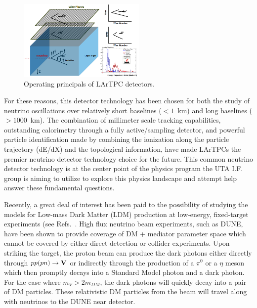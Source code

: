 \begin{figure}[htb]
\centering
\includegraphics[width=0.55\textwidth]{images/lartpc.png}
\caption[]{Operating principals of LArTPC detectors.}
\label{fig:LArTPC}
\end{figure}

For these reasons, this detector technology has been chosen for both the study of neutrino oscillations over relatively short baselines ($<1$~km) and long baselines ($>1000$~km). The combination of millimeter scale tracking capabilities, outstanding calorimetry through a fully active/sampling detector, and powerful particle identification made by combining the ionization along the particle trajectory (dE/dX) and the topological information, have made LArTPCs the premier neutrino detector technology choice for the future.  This common neutrino detector technology is at the center point of the physics program the UTA I.F. group is aiming to utilize to explore this physics landscape and attempt help answer these fundamental questions.

Recently, a great deal of interest has been paid to the possibility of studying the models for Low-mass Dark Matter (LDM) production at low-energy, fixed-target experiments (see Refs.~\cite{if:ldm-1, if:ldm-2,if:ldm-3, if:ldm-4)}.  High flux neutrino beam experiments, such as DUNE, have been shown to provide coverage of DM + mediator parameter space which cannot be covered by either direct detection or collider experiments. Upon striking the target, the proton beam can produce the dark photons either directly through $pp(pn)\rightarrow \bf{V}$ or indirectly through the production of a $\pi^{0}$ or a $\eta$ meson which then promptly decays into a Standard Model photon and a dark photon. For the case where $m_{V} > 2m_{DM}$, the dark photons will quickly decay into a pair of DM particles.  These relativistic DM particles from the beam will travel along with neutrinos to the DUNE near detector.  

